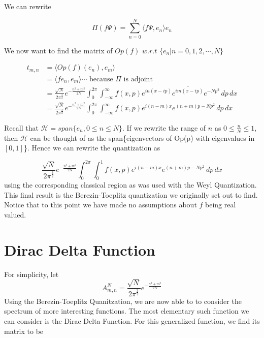 \documentclass{article}
\begin{document}
We can rewrite

\begin{equation}
\Pi(f\Psi) = \displaystyle\sum\limits_{n=0}^N\langle f\Psi,e_n\rangle e_n
\end{equation}

We now want to find the matrix of $Op(f)$ $w.r.t$ $\{e_n| n=0,1,2,\cdots,N\}$

\begin{equation}
\begin{split}
t_{m,n} &= \langle Op(f)(e_n),e_m\rangle \\
& =\langle fe_n,e_m\rangle \text{$\cdots$ because $\Pi$ is adjoint} \\
& = \frac{\sqrt{N}}{2\pi^{\frac{3}{2}}}e^{-\frac{n^2+m^2}{2N}}  \int^{2\pi}_{0} \! \int^{\infty}_{-\infty}f(x,p)e^{in(x-ip)}\overline{e^{im(x-ip)}}e^{-Np^{2}} \,dp \,dx \\
& =  \frac{\sqrt{N}}{2\pi^{\frac{3}{2}}}e^{-\frac{n^2+m^2}{2N}}  \int^{2\pi}_{0} \! \int^{\infty}_{-\infty}f(x,p)e^{i(n-m)x}e^{(n+m)p-Np^{2}} \,dp \,dx
\end{split}
\end{equation}

Recall that $\mathcal{H} = span\{e_n, 0\le n \le N\}$.  If we rewrite the range of $n$ as $0\le \frac{n}{N} \le 1$, then $\mathcal{H}$ can be thought of as the span\{eigenvectors of Op(p) with eigenvalues in $[0,1]$\}.  Hence we can rewrite the quantization as 

\begin{equation}
\frac{\sqrt{N}}{2\pi^{\frac{3}{2}}}e^{-\frac{n^2+m^2}{2N}}  \int^{2\pi}_{0} \! \int^{1}_{0}f(x,p)e^{i(n-m)x}e^{(n+m)p-Np^{2}} \,dp \,dx
\end{equation} using the corresponding classical region as was used with the Weyl Quantization.  This final result is the Berezin-Toeplitz quantization we originally set out to find.  Notice that to this point we have made no assumptions about $f$ being real valued.  

\section{Dirac Delta Function}

For simplicity, let
$$A_{m,n}^N = \frac{\sqrt{N}}{2\pi^{\frac{3}{2}}}e^{-\frac{n^2+m^2}{2N}}$$ Using the Berezin-Toeplitz Quanitzation, we are now able to to consider the spectrum of more interesting functions.  The most elementary such function we can consider is the Dirac Delta Function.  For this generalized function, we find its matrix to be 
\end{document}
